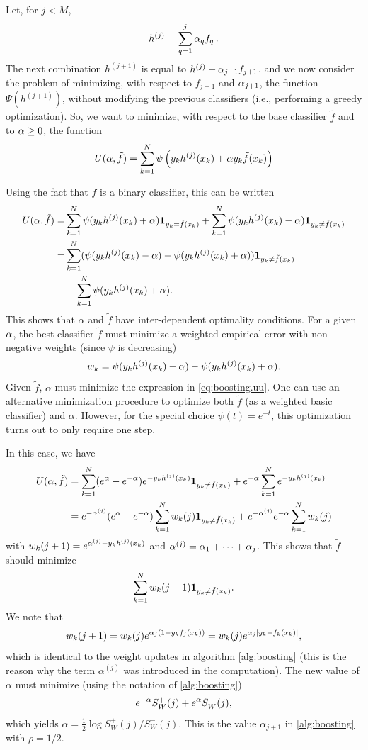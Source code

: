 Let, for $j<M$,
$$
h^{(j)} = \sum_{q=1}^j \alpha_q f_q\,.
$$
The next combination $h^{(j+1)}$  is equal to $h^{(j)} + \alpha_{j+1}
f_{j+1}$, and we now consider the problem of minimizing, with respect to   
$f_{j+1}$ and $\alpha_{j+1}$, the function $\Psi(h^{(j+1)})$, without modifying the previous classifiers (i.e., performing a greedy optimization). So, we want to minimize, with respect
to the base classifier $\tilde f$ and to $\alpha \geq 0$, the function
$$
U(\alpha, \tilde f) = \sum_{k=1}^N \psi\left(y_kh^{(j)}(x_k) + \alpha y_k \tilde
f(x_k)\right)
$$

Using the fact that $\tilde f$ is a binary classifier, this can be written
\begin{align}
U(\alpha, \tilde f) =& \sum_{k=1}^N \psi(y_kh^{(j)}(x_k) + \alpha) {\bm 1}_{y_k
= \tilde f(x_k)} + \sum_{k=1}^N \psi(y_kh^{(j)}(x_k) - \alpha) {\bm 1}_{y_k
\neq \tilde f(x_k)}
\label{eq:boosting.uu}
\\
\nonumber
=& \sum_{k=1}^N (\psi(y_kh^{(j)}(x_k) - \alpha) - \psi(y_kh^{(j)}(x_k) + \alpha)) {\bm 1}_{y_k
\neq \tilde f(x_k)} \\
\nonumber
&+ \sum_{k=1}^N \psi(y_kh^{(j)}(x_k) + \alpha).
\end{align}
This shows that $\alpha$ and $\tilde f$ have  inter-dependent optimality conditions.
For a given $\alpha$, the best classifier $\tilde f$ must
minimize a weighted empirical error with non-negative weights (since $\psi$ is decreasing)
$$ w_k  = \psi(y_kh^{(j)}(x_k) - \alpha) - \psi(y_kh^{(j)}(x_k) + \alpha).$$
Given $\tilde{f}$, $\alpha$ must minimize the expression in \cref{eq:boosting.uu}. One can use an alternative minimization procedure to optimize both $\tilde f$ (as a weighted basic classifier) and $\alpha$. However, for the special choice $\psi(t) = e^{-t}$, this optimization turns out to only require one step.

In this case, we have
\begin{align*}
U(\alpha, \tilde f) &= \sum_{k=1}^N (e^{\alpha} - e^{-\alpha}) e^{-y_kh^{(j)}(x_k)} {\bm 1}_{y_k
\neq \tilde f(x_k)} 
+ e^{-\alpha} \sum_{k=1}^N e^{-y_kh^{(j)}(x_k)}\\
&=e^{-\alpha^{(j)}} (e^{\alpha} - e^{-\alpha})  \sum_{k=1}^N w_k(j) {\bm 1}_{y_k
\neq \tilde f(x_k)} 
+ e^{-\alpha^{(j)}} e^{-\alpha} \sum_{k=1}^N w_k(j)\\
\end{align*}
with 
$w_k(j+1) = e^{\alpha^{(j)}-y_kh^{(j)}(x_k)} $
and $\alpha^{(j)} = \alpha_1 + \cdots + \alpha_j$. 
This shows that $\tilde{f}$ should minimize
\[
\sum_{k=1}^N w_k(j+1)  {\bm 1}_{y_k \neq \tilde f(x_k)}.
\]
We note that 
\[
w_k(j+1) = w_k(j) e^{\alpha_j(1-y_k f_{j}(x_k))} = w_k(j) e^{ \alpha_j |y_k - f_k(x_k)|},
\]
which is identical to the weight updates in algorithm \cref{alg:boosting} (this is the reason why the term $\alpha^{(j)}$ was introduced in the computation). The new value of $\alpha$ must minimize (using the notation of \cref{alg:boosting})
\[
e^{-\alpha}S_W^+(j)  + e^{\alpha} S_W^-(j),
\]
which yields $\alpha = \frac12 \log S_W^+(j)/S_W^-(j)$. This is the value $\alpha_{j+1}$ in \cref{alg:boosting} with $\rho=1/2$.




